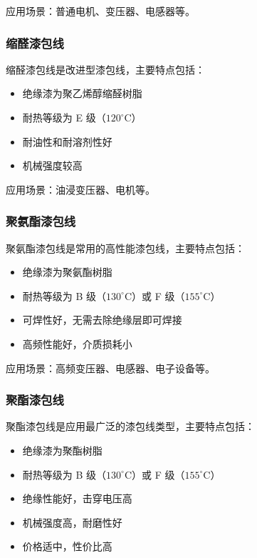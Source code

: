 \documentclass[12pt,UTF8]{ctexbook}
\begin{document}
应用场景：普通电机、变压器、电感器等。

\subsubsection{缩醛漆包线}

缩醛漆包线是改进型漆包线，主要特点包括：

\begin{itemize}[leftmargin=2cm]
    \item 绝缘漆为聚乙烯醇缩醛树脂
    \item 耐热等级为 E 级（$120^\circ$C）
    \item 耐油性和耐溶剂性好
    \item 机械强度较高
\end{itemize}

应用场景：油浸变压器、电机等。

\subsubsection{聚氨酯漆包线}

聚氨酯漆包线是常用的高性能漆包线，主要特点包括：

\begin{itemize}[leftmargin=2cm]
    \item 绝缘漆为聚氨酯树脂
    \item 耐热等级为 B 级（$130^\circ$C）或 F 级（$155^\circ$C）
    \item 可焊性好，无需去除绝缘层即可焊接
    \item 高频性能好，介质损耗小
\end{itemize}

应用场景：高频变压器、电感器、电子设备等。

\subsubsection{聚酯漆包线}

聚酯漆包线是应用最广泛的漆包线类型，主要特点包括：

\begin{itemize}[leftmargin=2cm]
    \item 绝缘漆为聚酯树脂
    \item 耐热等级为 B 级（$130^\circ$C）或 F 级（$155^\circ$C）
    \item 绝缘性能好，击穿电压高
    \item 机械强度高，耐磨性好
    \item 价格适中，性价比高
\end{itemize}
\end{document}
